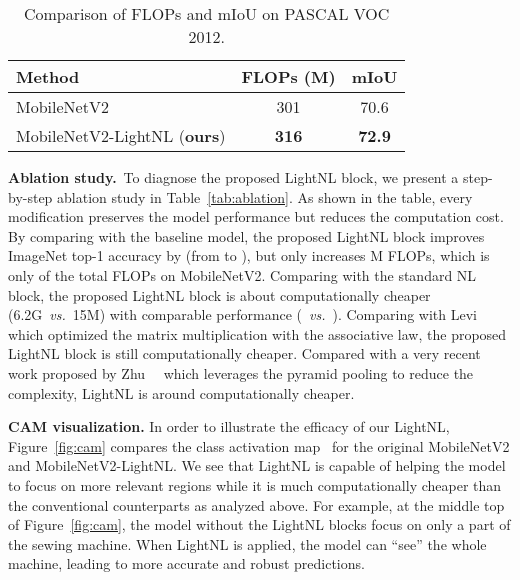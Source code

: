\documentclass[10pt,twocolumn,letterpaper]{article}
\begin{document}
\begin{table}[tb]
\renewcommand\arraystretch{0.95}
\small
\centering
\begin{tabular}{lcc}
\toprule
Method   & FLOPs (M) & mIoU          \\
\midrule
MobileNetV2       & 301   & 70.6 \\
MobileNetV2-LightNL (\textbf{ours}) &   \textbf{316}  & \textbf{72.9} \\ 
\bottomrule
\end{tabular}
\caption{Comparison of FLOPs and mIoU on PASCAL VOC 2012.}
\label{tab:seg}
\vspace{-1em}
\end{table}

\vspace{0.5ex}\noindent\textbf{Ablation study.}~To diagnose the proposed LightNL block, we present a step-by-step ablation study in Table~\ref{tab:ablation}. As shown in the table, every modification preserves the model performance but reduces the computation cost. By comparing with the baseline model, the proposed LightNL block improves ImageNet top-1 accuracy by  (from  to ), but only increases M FLOPs, which is only  of the total FLOPs on MobileNetV2. Comparing with the standard NL block, the proposed LightNL block is about  computationally cheaper (6.2G~\emph{vs.}~15M) with comparable performance (~\emph{vs.}~). Comparing with Levi~\etal~\cite{levi2018efficient} which optimized the matrix multiplication with the associative law, the proposed LightNL block is still  computationally cheaper. Compared with a very recent work proposed by Zhu~\etal~\cite{zhu2019asymmetric} which leverages the pyramid pooling to reduce the complexity, LightNL is around  computationally cheaper.

\vspace{0.5ex}\noindent\textbf{CAM visualization.} 
In order to illustrate the efficacy of our LightNL, Figure~\ref{fig:cam} compares the class activation map~\cite{zhou2016learning} for the original MobileNetV2 and MobileNetV2-LightNL. We see that LightNL is capable of helping the model to focus on more relevant regions while it is much computationally cheaper than the conventional counterparts as analyzed above. For example, at the middle top of Figure~\ref{fig:cam}, the model without the LightNL blocks focus on only a part of the sewing machine. When LightNL is applied, the model can ``see'' the whole machine, leading to more accurate and robust predictions.
\end{document}
